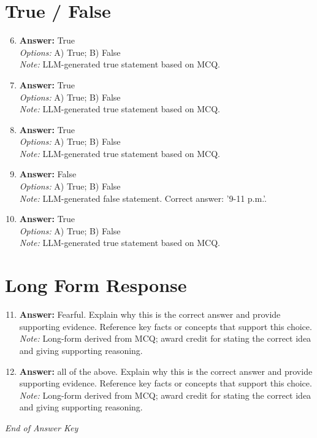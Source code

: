 \documentclass[12pt]{article}
\begin{document}
\section*{True / False}
\begin{enumerate}[label=\arabic*.]
\setcounter{enumi}{5}
\item \textbf{Answer:} True
\\ \textit{Options:} A) True; B) False
\\ \textit{Note:} LLM-generated true statement based on MCQ.
\item \textbf{Answer:} True
\\ \textit{Options:} A) True; B) False
\\ \textit{Note:} LLM-generated true statement based on MCQ.
\item \textbf{Answer:} True
\\ \textit{Options:} A) True; B) False
\\ \textit{Note:} LLM-generated true statement based on MCQ.
\item \textbf{Answer:} False
\\ \textit{Options:} A) True; B) False
\\ \textit{Note:} LLM-generated false statement. Correct answer: '9-11 p.m.'.
\item \textbf{Answer:} True
\\ \textit{Options:} A) True; B) False
\\ \textit{Note:} LLM-generated true statement based on MCQ.
\end{enumerate}

\section*{Long Form Response}
\begin{enumerate}[label=\arabic*.]
\setcounter{enumi}{10}
\item \textbf{Answer:} Fearful. Explain why this is the correct answer and provide supporting evidence. Reference key facts or concepts that support this choice.
\\ \textit{Note:} Long-form derived from MCQ; award credit for stating the correct idea and giving supporting reasoning.
\item \textbf{Answer:} all of the above. Explain why this is the correct answer and provide supporting evidence. Reference key facts or concepts that support this choice.
\\ \textit{Note:} Long-form derived from MCQ; award credit for stating the correct idea and giving supporting reasoning.
\end{enumerate}

\vfill
\noindent\textit{End of Answer Key}
\end{document}
